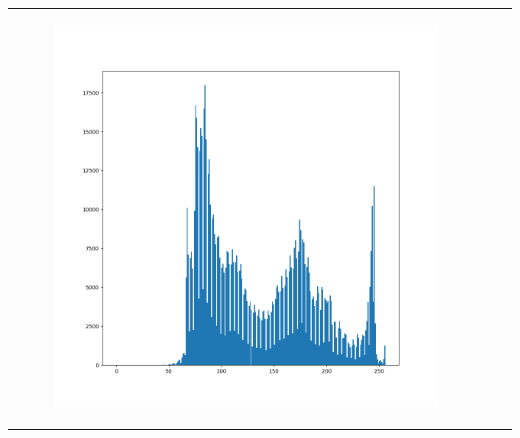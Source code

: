 \begin{frame}
\begin{tabular}{ccc}
\begin{minipage}{0.3\textwidth}
            \begin{figure}[H]

	    \includegraphics[width=\textwidth]{images/histoAffine20-180t.png}
	     \end{figure}
        \end{minipage}\\
       
        
    \end{tabular}\\

\end{frame}





